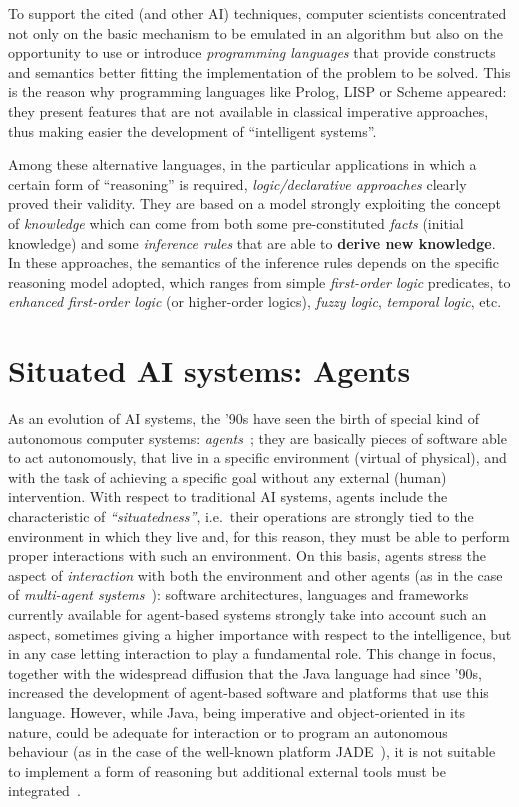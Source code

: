 To support the cited (and other AI) techniques, computer scientists
concentrated not only on the basic mechanism to be emulated in an algorithm
but also on the opportunity to use or introduce \emph{programming
  languages} that provide constructs and semantics better fitting the
implementation of the problem to be solved.
This is the reason why programming languages like Prolog, LISP or Scheme
appeared: they present features that are not available in classical
imperative approaches, thus making easier the development of ``intelligent
systems''.

Among these alternative languages, in the particular applications in which
a certain form of ``reasoning''
is required, \emph{logic/declarative approaches} clearly proved their
validity.
They are based on a model strongly exploiting the concept of
\emph{knowledge} which can come from both some pre-constituted \emph{facts}
(initial knowledge)
and some \emph{inference rules} that are able to \textbf{derive new
knowledge}.
In these approaches, the semantics of the inference rules depends on the
specific reasoning model adopted, which ranges from simple
\emph{first-order logic} predicates, to \emph{enhanced first-order logic}
(or higher-order logics), \emph{fuzzy logic}, \emph{temporal logic}, etc.


\section{Situated AI systems: Agents}
As an evolution of AI systems, the '90s have seen the birth of special kind
of autonomous computer systems: \emph{agents}~\cite{bradshaw};
they are basically pieces of software able to act autonomously, that live in
a specific environment (virtual of physical), and with the task of
achieving a specific goal without any external (human) intervention.
With respect to traditional AI systems, agents include the characteristic of
\emph{``situatedness''}, i.e.~their operations are strongly tied to the
environment in which they live and, for this reason, they must be able to
perform proper interactions with such an environment.
On this basis, agents stress the aspect of \emph{interaction} with both the
environment and other agents (as in the case of \emph{multi-agent
  systems}~\cite{weiss}): software architectures, languages and frameworks
currently available for agent-based systems strongly take into account such
an aspect, sometimes giving a higher importance with respect to the
intelligence, but in any case letting interaction to play a fundamental
role.
This change in focus, together with the widespread diffusion that the
Java\texttrademark{}
language had since '90s, increased the development of agent-based
software and platforms that use this language.
However, while Java\texttrademark{}, being imperative and object-oriented
in its nature,
could be adequate for interaction or to program an autonomous behaviour (as
in the case of the well-known platform JADE~\cite{jade-book}), it is not
suitable to implement a form of reasoning but additional external tools
must be integrated~\cite{jess,drools,jasonbook}.


